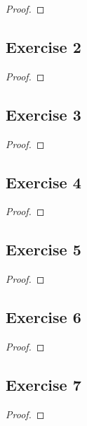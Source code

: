 \documentclass[14pt]{extarticle}
\begin{document}
\begin{proof}

\end{proof}

\subsection{Exercise 2}

\begin{proof}

\end{proof}

\subsection{Exercise 3}

\begin{proof}

\end{proof}

\subsection{Exercise 4}

\begin{proof}

\end{proof}

\subsection{Exercise 5}

\begin{proof}

\end{proof}

\subsection{Exercise 6}

\begin{proof}

\end{proof}

\subsection{Exercise 7}

\begin{proof}

\end{proof}
\end{document}
